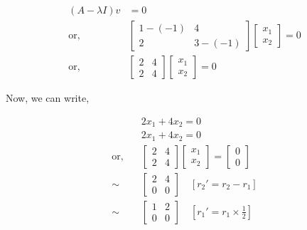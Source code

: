 \documentclass{article}
\begin{document}
    \[
    \begin{aligned}
        (A - \lambda I) v &= 0 \\
        \text{or,} \quad &\begin{bmatrix}
            1-(-1) & 4 \\
            2 & 3-(-1)
        \end{bmatrix} \begin{bmatrix}
            x_1 \\
            x_2
        \end{bmatrix} = 0 \\
        \text{or,} \quad &\begin{bmatrix}
            2 & 4 \\
            2 & 4
        \end{bmatrix} \begin{bmatrix}
            x_1 \\
            x_2
        \end{bmatrix} = 0
    \end{aligned}
    \]
    
    \newpage
    Now, we can write,
    
    \[
    \begin{aligned}
        &2x_1 + 4x_2 = 0 \\
        &2x_1 + 4x_2 = 0 \\
        \text{or,} \quad &\begin{bmatrix}
            2 & 4 \\
            2 & 4
        \end{bmatrix} \begin{bmatrix}
            x_1 \\
            x_2
        \end{bmatrix} = \begin{bmatrix}
            0 \\
            0
        \end{bmatrix} \\
        \sim \quad &\begin{bmatrix}
            2 & 4 \\
            0 & 0
        \end{bmatrix} \quad [r_2' = r_2 - r_1] \\
        \sim \quad &\begin{bmatrix}
            1 & 2 \\
            0 & 0
        \end{bmatrix} \quad [r_1' = r_1 \times \frac{1}{2}]
    \end{aligned}
    \]
    
\end{document}
